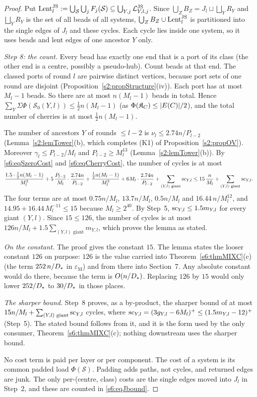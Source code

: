 \begin{proof}
Put $\mathrm{Lent}^{\mathrm{JS}}_l:=\bigcup_{\mathcal S}\bigcup_jF_j(\mathcal S)\subseteq\bigcup_{Y,j}\mathcal{L}^{\mathrm{JS}}_{Y,l,j}$. Since $\bigcup_ZB_Z=J_l\sqcup\bigsqcup_YR_Y$ and $\bigsqcup_YR_Y$ is the set of all beads of all systems, $\bigcup_ZB_Z\cup\mathrm{Lent}^{\mathrm{JS}}_l$ is partitioned into the single edges of $J_l$ and these cycles. Each cycle lies inside one system, so it uses beads and lent edges of one ancestor $Y$ only.

\emph{Step 8: the count.} Every bead has exactly one end that is a port of its class (the other end is a centre, possibly a pseudo-hub). Count beads at that end. The classed ports of round $l$ are pairwise distinct vertices, because port sets of one round are disjoint (Proposition~\ref{s2:propStructure}(iv)). Each port has at most $M_l-1$ beads. So there are at most $n(M_l-1)$ beads in total. Hence $\sum_Y\Sigma\Phi(\mathcal S_0(Y,l))\le\frac12n(M_l-1)$ (as $\Phi(\mathfrak{K}_C)\le|E(C)|/2$), and the total number of cherries is at most $\frac12n(M_l-1)$.

The number of ancestors $Y$ of rounds $\le l-2$ is $\nu_l\le2.74n/P_{l-2}$ (Lemma~\ref{s2:lemTower}(b), which completes (K1) of Proposition~\ref{s2:propOV}). Moreover $\gamma_l\le P_{l-2}/M_l$ and $P_{l-2}\ge M_l^{13}$ (Lemma~\ref{s2:lemTower}(b)). By \eqref{s6:eqSzeroCost} and \eqref{s6:eqCherryCost}, the number of cycles is at most
\[
\frac{1.5\cdot\frac12n(M_l-1)}{M_l^2}+5\,\frac{P_{l-2}}{M_l}\cdot\frac{2.74n}{P_{l-2}}+\frac{\frac12n(M_l-1)}{M_l^2}+6M_l\cdot\frac{2.74n}{P_{l-2}}+\sum_{(Y,l)\text{ giant}}\mathrm{sc}_{Y,l}
\le15\,\frac n{M_l}+\sum_{(Y,l)\text{ giant}}\mathrm{sc}_{Y,l}.
\]
The four terms are at most $0.75n/M_l$, $13.7n/M_l$, $0.5n/M_l$ and $16.44\,n/M_l^{12}$, and $14.95+16.44\,M_l^{-11}\le15$ because $M_l\ge2^{40}$. By Step~5, $\mathrm{sc}_{Y,l}\le1.5m_{Y,l}$ for every giant $(Y,l)$. Since $15\le126$, the number of cycles is at most $126n/M_l+1.5\sum_{(Y,l)\text{ giant}}m_{Y,l}$, which proves the lemma as stated.

\emph{On the constant.} The proof gives the constant $15$. The lemma states the looser constant $126$ on purpose: $126$ is the value carried into Theorem~\ref{s6:thmMIXC}(c) (the term $252\,n/D_{*}$ in $\varepsilon_{\mathrm M}$) and from there into Section~7. Any absolute constant would do there, because the term is $O(n/D_{*})$. Replacing $126$ by $15$ would only lower $252/D_{*}$ to $30/D_{*}$ in those places.

\emph{The sharper bound.} Step~8 proves, as a by-product, the sharper bound of at most $15n/M_l+\sum_{(Y,l)\text{ giant}}\mathrm{sc}_{Y,l}$ cycles, where $\mathrm{sc}_{Y,l}=(3g_{Y,l}-6M_l)^+\le(1.5m_{Y,l}-12)^+$ (Step~5). The stated bound follows from it, and it is the form used by the only consumer, Theorem~\ref{s6:thmMIXC}(c); nothing downstream uses the sharper bound.

No cost term is paid per layer or per component. The cost of a system is its common padded load $\Phi(\mathcal S)$. Padding adds paths, not cycles, and returned edges are junk. The only per-(centre, class) costs are the single edges moved into $J_l$ in Step~2, and these are counted in \eqref{s6:eqJbound}.
\end{proof}

